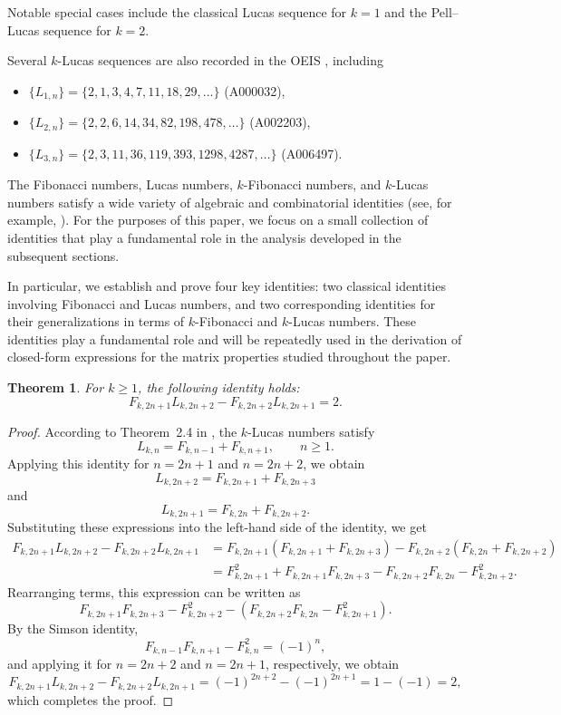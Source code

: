 \documentclass[11pt]{birkjour}
\newtheorem{thm}{Theorem}[section]
\theoremstyle{definition}
\theoremstyle{remark}
\numberwithin{equation}{section}
\begin{document}
\noindent
Notable special cases include the classical Lucas sequence for $k=1$ and the Pell--Lucas sequence for $k=2$.

\par\smallskip
\noindent
Several $k$-Lucas sequences are also recorded in the OEIS \cite{OEIS}, including
\begin{itemize}
    \item $\{L_{1,n}\}=\{2,1,3,4,7,11,18,29,\ldots\}$ (A000032),
    \item $\{L_{2,n}\}=\{2,2,6,14,34,82,198,478,\ldots\}$ (A002203),
    \item $\{L_{3,n}\}=\{2,3,11,36,119,393,1298,4287,\ldots\}$ (A006497).
\end{itemize}

\par\smallskip
\noindent
The Fibonacci numbers, Lucas numbers, $k$-Fibonacci numbers, and $k$-Lucas numbers satisfy a wide variety of algebraic and combinatorial identities (see, for example, \cite{koshy,Falcon2011,FalconPlaza2009}). For the purposes of this paper, we focus on a small collection of identities that play a fundamental role in the analysis developed in the subsequent sections.
\par\smallskip

\noindent In particular, we establish and prove four key identities: two classical identities involving Fibonacci and Lucas numbers, and two corresponding identities for their generalizations in terms of $k$-Fibonacci and $k$-Lucas numbers. These identities play a fundamental role and will be repeatedly used in the derivation of closed-form expressions for the matrix properties studied throughout the paper.

\begin{thm}\label{restagen}
For $k \geq 1$, the following identity holds:
\[
F_{k,2n+1}L_{k,2n+2}-F_{k,2n+2}L_{k,2n+1}=2.
\]
\end{thm}

\begin{proof}
According to Theorem~2.4 in \cite{Falcon2011}, the $k$-Lucas numbers satisfy
\[
L_{k,n}=F_{k,n-1}+F_{k,n+1}, \qquad n \geq 1.
\]
Applying this identity for $n=2n+1$ and $n=2n+2$, we obtain
\[
L_{k,2n+2}=F_{k,2n+1}+F_{k,2n+3}
\]
and
\[
L_{k,2n+1}=F_{k,2n}+F_{k,2n+2}.
\]
Substituting these expressions into the left-hand side of the identity, we get
\begin{align*}
F_{k,2n+1}L_{k,2n+2}-F_{k,2n+2}L_{k,2n+1}
&=F_{k,2n+1}\left(F_{k,2n+1}+F_{k,2n+3}\right)
 -F_{k,2n+2}\left(F_{k,2n}+F_{k,2n+2}\right)\\
&=F_{k,2n+1}^2+F_{k,2n+1}F_{k,2n+3}
 -F_{k,2n+2}F_{k,2n}-F_{k,2n+2}^2.
\end{align*}
Rearranging terms, this expression can be written as
\[
F_{k,2n+1}F_{k,2n+3}-F_{k,2n+2}^2
-\left(F_{k,2n+2}F_{k,2n}-F_{k,2n+1}^2\right).
\]
By the Simson identity,
\[
F_{k,n-1}F_{k,n+1}-F_{k,n}^2=(-1)^n,
\]
and applying it for $n=2n+2$ and $n=2n+1$, respectively, we obtain
\[
F_{k,2n+1}L_{k,2n+2}-F_{k,2n+2}L_{k,2n+1}
=(-1)^{2n+2}-(-1)^{2n+1}=1-(-1)=2,
\]
which completes the proof.
\end{proof}
\end{document}
